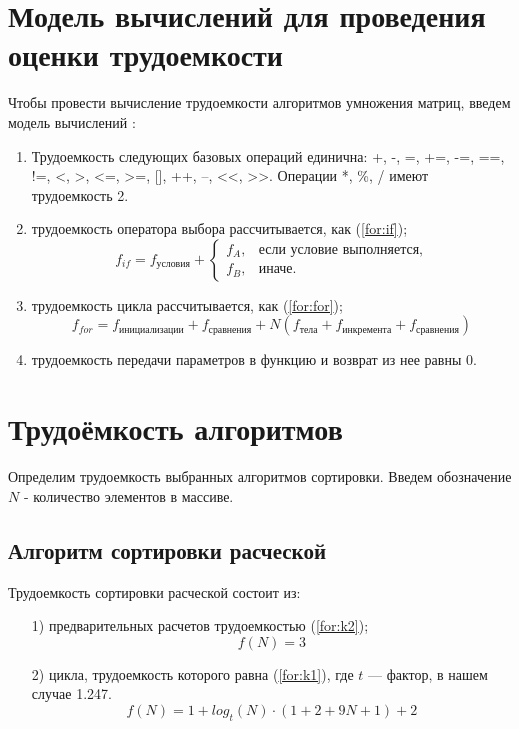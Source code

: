 \clearpage

\section{Модель вычислений для проведения оценки трудоемкости}
Чтобы провести вычисление трудоемкости алгоритмов умножения матриц, введем модель вычислений \cite{model}:

\begin{enumerate}[label=\arabic*)]
	\item Трудоемкость следующих базовых операций единична:
	+, -, =, +=, -=, ==, !=, <, >, <=, >=, [], ++, --, <<, >>.
	Операции *, \%, / имеют трудоемкость 2.
	\item трудоемкость оператора выбора  рассчитывается, как (\ref{for:if});
	\begin{equation}
		\label{for:if}
		f_{if} = f_{\text{условия}} +
		\begin{cases}
			f_A, & \text{если условие выполняется,}\\
			f_B, & \text{иначе.}
		\end{cases}
	\end{equation}
	\item трудоемкость цикла рассчитывается, как (\ref{for:for});
	\begin{equation}
		\label{for:for}
		f_{for} = f_{\text{инициализации}} + f_{\text{сравнения}} + N(f_{\text{тела}} + f_{\text{инкремента}} + f_{\text{сравнения}})
	\end{equation}
	\item трудоемкость передачи параметров в функцию и возврат из нее равны 0.
\end{enumerate}


\section{Трудоёмкость алгоритмов}

Определим трудоемкость выбранных алгоритмов сортировки. Введем обозначение $N$ - количество элементов в массиве.

\subsection{Алгоритм сортировки расческой}

Трудоемкость сортировки расческой состоит из:
\begin{enumerate}
	\item[1)] предварительных расчетов трудоемкостью (\ref{for:k2});
	\begin{equation}
		\label{for:k2}
		f(N) = 3
	\end{equation}
	\item[2)] цикла, трудоемкость которого равна (\ref{for:k1}), где $t$ --- фактор, в нашем случае 1.247. 
	\begin{equation}
		\label{for:k1}
		f(N) = 1 + log_t(N) \cdot (1 + 2 + 9N + 1) + 2
	\end{equation}
\end{enumerate}

